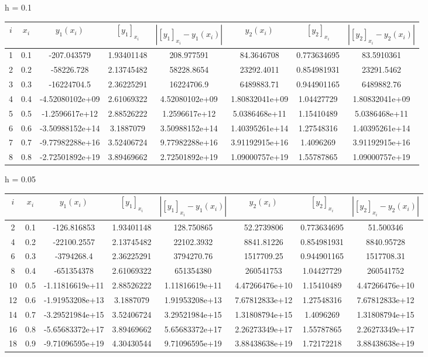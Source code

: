 \documentclass[11pt]{article}
\begin{document}
h = 0.1 \\ 
\begin{tabular}{c | c c c c c c c}
$i$ & $x_i$ & $y_1(x_i)$ & $[y_1]_{x_i}$ & $|[y_1]_{x_i} - y_1(x_i)|$ & $y_2(x_i)$ & $[y_2]_{x_i}$ & $|[y_2]_{x_i} - y_2(x_i)|$ \\ \hline
1 & 0.1 & -207.043579 & 1.93401148 & 208.977591 & 84.3646708 & 0.773634695 & 83.5910361 \\
2 & 0.2 & -58226.728 & 2.13745482 & 58228.8654 & 23292.4011 & 0.854981931 & 23291.5462 \\
3 & 0.3 & -16224704.5 & 2.36225291 & 16224706.9 & 6489883.71 & 0.944901165 & 6489882.76 \\
4 & 0.4 & -4.52080102e+09 & 2.61069322 & 4.52080102e+09 & 1.80832041e+09 & 1.04427729 & 1.80832041e+09 \\
5 & 0.5 & -1.2596617e+12 & 2.88526222 & 1.2596617e+12 & 5.0386468e+11 & 1.15410489 & 5.0386468e+11 \\
6 & 0.6 & -3.50988152e+14 & 3.1887079 & 3.50988152e+14 & 1.40395261e+14 & 1.27548316 & 1.40395261e+14 \\
7 & 0.7 & -9.77982288e+16 & 3.52406724 & 9.77982288e+16 & 3.91192915e+16 & 1.4096269 & 3.91192915e+16 \\
8 & 0.8 & -2.72501892e+19 & 3.89469662 & 2.72501892e+19 & 1.09000757e+19 & 1.55787865 & 1.09000757e+19 \\
\end{tabular} \newpage

h = 0.05 \\ 
\begin{tabular}{c | c c c c c c c}
$i$ & $x_i$ & $y_1(x_i)$ & $[y_1]_{x_i}$ & $|[y_1]_{x_i} - y_1(x_i)|$ & $y_2(x_i)$ & $[y_2]_{x_i}$ & $|[y_2]_{x_i} - y_2(x_i)|$ \\ \hline
2 & 0.1 & -126.816853 & 1.93401148 & 128.750865 & 52.2739806 & 0.773634695 & 51.500346 \\
4 & 0.2 & -22100.2557 & 2.13745482 & 22102.3932 & 8841.81226 & 0.854981931 & 8840.95728 \\
6 & 0.3 & -3794268.4 & 2.36225291 & 3794270.76 & 1517709.25 & 0.944901165 & 1517708.31 \\
8 & 0.4 & -651354378 & 2.61069322 & 651354380 & 260541753 & 1.04427729 & 260541752 \\
10 & 0.5 & -1.11816619e+11 & 2.88526222 & 1.11816619e+11 & 4.47266476e+10 & 1.15410489 & 4.47266476e+10 \\
12 & 0.6 & -1.91953208e+13 & 3.1887079 & 1.91953208e+13 & 7.67812833e+12 & 1.27548316 & 7.67812833e+12 \\
14 & 0.7 & -3.29521984e+15 & 3.52406724 & 3.29521984e+15 & 1.31808794e+15 & 1.4096269 & 1.31808794e+15 \\
16 & 0.8 & -5.65683372e+17 & 3.89469662 & 5.65683372e+17 & 2.26273349e+17 & 1.55787865 & 2.26273349e+17 \\
18 & 0.9 & -9.71096595e+19 & 4.30430544 & 9.71096595e+19 & 3.88438638e+19 & 1.72172218 & 3.88438638e+19 \\
\end{tabular}
\end{document}
